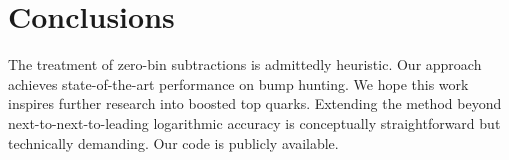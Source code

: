 \section{Conclusions}\label{sec:conclusions}

The treatment of zero-bin subtractions is admittedly heuristic. Our
approach achieves state-of-the-art performance on bump hunting. We hope
this work inspires further research into boosted top quarks. Extending
the method beyond next-to-next-to-leading logarithmic accuracy is
conceptually straightforward but technically demanding. Our code is
publicly available.

